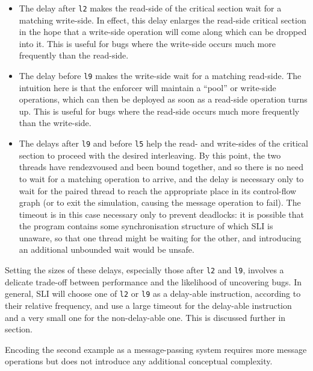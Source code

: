 \begin{itemize}
\item
  The delay after \verb|l2| makes the read-side of the critical
  section wait for a matching write-side.  In effect, this delay
  enlarges the read-side critical section in the hope that a
  write-side operation will come along which can be dropped into it.
  This is useful for bugs where the write-side occurs much more
  frequently than the read-side.
\item
  The delay before \verb|l9| makes the write-side wait for a matching
  read-side.  The intuition here is that the enforcer will maintain a
  ``pool'' or write-side operations, which can then be deployed as
  soon as a read-side operation turns up.  This is useful for bugs
  where the read-side occurs much more frequently than the write-side.
\item
  The delays after \verb|l9| and before \verb|l5| help the read- and
  write-sides of the critical section to proceed with the desired
  interleaving.  By this point, the two threads have rendezvoused and
  been bound together, and so there is no need to wait for a matching
  operation to arrive, and the delay is necessary only to wait for the
  paired thread to reach the appropriate place in its control-flow
  graph (or to exit the simulation, causing the message operation to
  fail).  The timeout is in this case necessary only to prevent
  deadlocks: it is possible that the program contains some
  synchronisation structure of which SLI is unaware, so that one
  thread might be waiting for the other, and introducing an additional
  unbounded wait would be unsafe.
\end{itemize}

Setting the sizes of these delays, especially those after \verb|l2|
and \verb|l9|, involves a delicate trade-off between performance and
the likelihood of uncovering bugs.  In general, SLI will choose one of
\verb|l2| or \verb|l9| as a delay-able instruction, according to their
relative frequency, and use a large timeout for the delay-able
instruction and a very small one for the non-delay-able one.  This is
discussed further in section\needCite{}.

Encoding the second example as a message-passing system requires more
message operations but does not introduce any additional conceptual
complexity.

